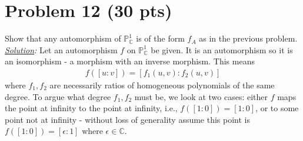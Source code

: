 \documentclass[12pt]{article}
\newcommand{\C}{\mathbb{C}}
\begin{document}
\newpage







\section*{Problem 12 \small{(30 pts)}}
Show that any automorphism of $\mathbb{P}^1_\C$ is of the form $f_A$ as in the previous problem. \\


\noindent \textit{\underline{Solution}:} Let an automorphism $f$ on $\mathbb{P}^1_\C$ be given. It is an automorphism so it is an isomorphism - a morphism with an inverse morphism. This means 
\begin{align*}
f([u:v]) = [f_1(u,v) : f_2(u,v)]
\end{align*}
where $f_1,f_2$ are necessarily ratios of homogeneous polynomials of the same degree. To argue what degree $f_1,f_2$ must be, we look at two cases:  either $f$ maps the point at infinity to the point at infinity, i.e., $f([1:0]) = [1:0]$, or to some point not at infinity - without loss of generality assume this point is $f([1:0]) = [\epsilon:1]$ where $\epsilon \in \C$. 
\end{document}
